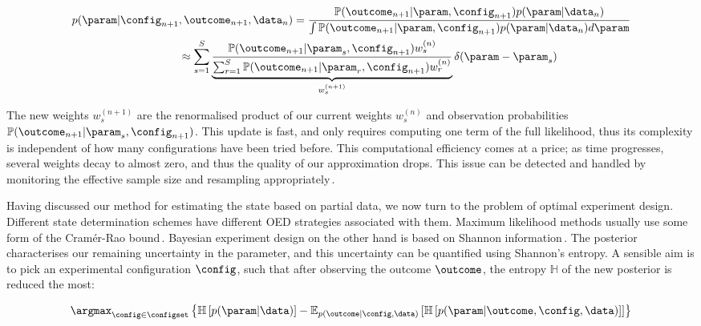\begin{align}
	p(\param\vert\config_{n+1}&,\outcome_{n+1},\data_n) = \frac{\mathbb{P}(\outcome_{n+1}\vert\param,\config_{n+1})p(\param\vert\data_n)}{\int \mathbb{P}(\outcome_{n+1}\vert\param,\config_{n+1})p(\param\vert\data_n) d\param}\label{Eqn:SISupdate}\\
	&\approx \sum_{s=1}^{S}\underbrace{\frac{\mathbb{P}(\outcome_{n+1}\vert\param_s,\config_{n+1})w^{(n)}_s}{\sum_{r=1}^{S}\mathbb{P}(\outcome_{n+1}\vert\param_r,\config_{n+1})w^{(n)}_r}}_{w^{(n+1)}_s}\delta(\param-\param_s)\notag
\end{align}

The new weights $w^{(n+1)}_s$ are the renormalised product of our current weights $w^{(n)}_s$ and observation probabilities $\mathbb{P}(\outcome_{n+1}\vert\param_s,\config_{n+1})$. This update is fast, and only requires computing one term of the full likelihood, thus its complexity is independent of how many configurations have been tried before. This computational efficiency comes at a price; as time progresses, several weights decay to almost zero, and thus the quality of our approximation drops. This issue can be detected and handled by monitoring the effective sample size and resampling appropriately\,\citep{SMCBook}.

Having discussed our method for estimating the state based on partial data, we now turn to the problem of optimal experiment design. Different state determination schemes have different OED strategies associated with them. Maximum likelihood methods usually use some form of the Cram\'{e}r-Rao bound\,\citep{OEDFirst,OEDAverage}. Bayesian experiment design on the other hand is based on Shannon information\,\citep{MUBFirst,ExactInformation}. The posterior characterises our remaining uncertainty in the parameter, and this uncertainty can be quantified using Shannon's entropy. A sensible aim is to pick an experimental configuration $\config$, such that after observing the outcome $\outcome$, the entropy $\mathbb{H}$ of the new posterior is reduced the most:

\begin{equation}
\argmax_{\config\in\configset} \left\{ \mathbb{H}\left[p(\param|\data)\right] - \mathbb{E}_{p(\outcome\vert\config,\data)}\left[\mathbb{H}\left[ p(\param|\outcome,\config,\data) \right] \right]\right\}\label{Eqn:expectedentropyreduction}
\end{equation} 


